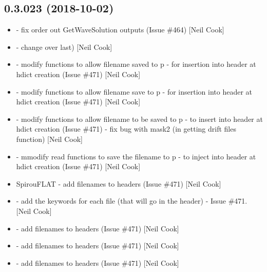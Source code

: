 \documentclass[a4paper,10pt,english]{report}
\begin{document}
\subsection{0.3.023 (2018-10-02)}
\label{\detokenize{misc/changelog:id309}}\begin{itemize}
\item {} 
 - fix order out GetWaveSolution outputs (Issue
\#464) {[}Neil Cook{]}

\item {} 
 - change over  last) {[}Neil Cook{]}

\item {} 
 - modify functions to allow filename saved to p -
for insertion into header at hdict creation (Issue  \#471) {[}Neil Cook{]}

\item {} 
 - modify functions to allow filename save to p - for
insertion into header at hdict creation (Issue  \#471) {[}Neil Cook{]}

\item {} 
 - modify functions to allow filename to be saved to p -
to insert into header at hdict creation (Issue  \#471) - fix bug with
mask2 (in getting drift files function) {[}Neil Cook{]}

\item {} 
 - mmodify read functions to save the filename to p - to
inject into header at hdict creation (Issue  \#471) {[}Neil Cook{]}

\item {} 
SpirouFLAT - add filenames to headers (Issue  \#471) {[}Neil Cook{]}

\item {} 
 - add the keywords for each file (that will go in
the header) - Issue  \#471. {[}Neil Cook{]}

\item {} 
 - add filenames to headers (Issue  \#471) {[}Neil Cook{]}

\item {} 
 - add filenames to headers (Issue  \#471)
{[}Neil Cook{]}

\item {} 
 - add filenames to headers (Issue  \#471) {[}Neil Cook{]}


\end{itemize}
\end{document}
